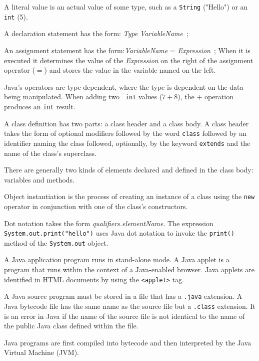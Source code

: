 \begin{BL}
\item A literal value is an actual value of some type, such as
a {\tt String} ("Hello") or an {\tt int} (5).

\item A declaration statement has the form: \hbox{\it Type} \hbox{\it VariableName}\ ;

\item An assignment statement has the form:\hbox{\it VariableName} = \hbox{\it Expression}\ ;
When it is executed it determines the value of the {\it Expression} on
the right of the assignment operator ($=$) and stores the value in the
variable named on the left.

\item Java's operators are type dependent, where the 
type is dependent on the data being manipulated.  When adding two {\tt
int} values ($7 + 8$), the $+$ operation produces an {\tt int} result.

\item A class definition has two parts: a class header and a class body.
A class header takes the form of optional modifiers followed by the
word {\tt class} followed by an identifier naming the class followed,
optionally, by the keyword {\tt extends} and the name of the class's
superclass.

\item There are generally two kinds of elements declared and defined in
the class body: variables and methods.

\item Object instantiation is the process of creating an instance of
a class using the {\tt new} operator in conjunction with one of the
class's constructors.

\item  Dot notation takes the form {\it qualifiers.elementName}. 
The expression {\tt System.out.print("hello")} uses Java dot notation
to invoke the {\tt print()} method of the {\tt System.out} object.

\item  A Java application program runs in stand-alone
mode.  A Java applet is a program that runs within the context of a
Java-enabled browser.  Java applets are identified in HTML documents
by using the {\tt <applet>} tag.

\item  A Java source program must be stored in a file that has a
{\tt .java} extension.  A Java bytecode file has the same name as the
source file but a {\tt .class} extension.  It is an error in Java if
the name of the source file is not identical to the name of the public
Java class defined within the file.

\item  Java programs are first compiled into bytecode
and then interpreted by the Java Virtual Machine (JVM).

\end{BL}


